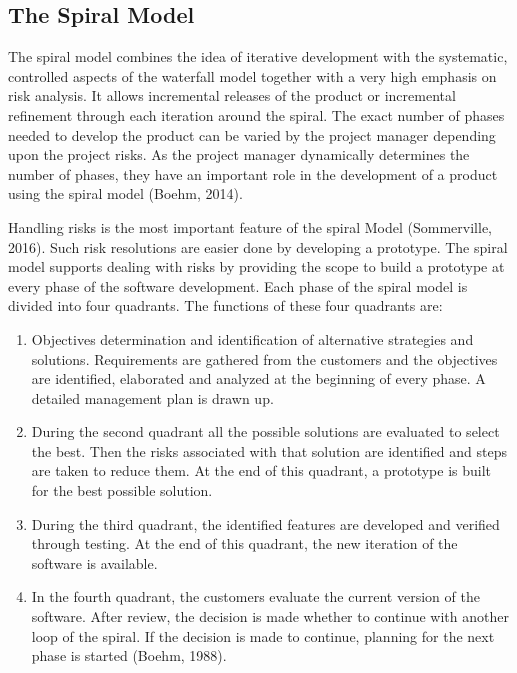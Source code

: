\subsection{The Spiral Model}

The spiral model combines the idea of iterative development with the systematic, controlled aspects of the waterfall model together with a very high emphasis on risk analysis. It allows incremental releases of the product or incremental refinement through each iteration around the spiral. The exact number of phases needed to develop the product can be varied by the project manager depending upon the project risks. As the project manager dynamically determines the number of phases, they have an important role in the development of a product using the spiral model (Boehm, 2014).

Handling risks is the most important feature of the spiral Model (Sommerville, 2016). Such risk resolutions are easier done by developing a prototype. The spiral model supports dealing with risks by providing the scope to build a prototype at every phase of the software development.
Each phase of the spiral model is divided into four quadrants. The functions of these four quadrants are:

\begin{enumerate}
	\item Objectives determination and identification of alternative strategies and solutions. Requirements are gathered from the customers and the objectives are identified, elaborated and analyzed at the beginning of every phase. A detailed management plan is drawn up.

	\item During the second quadrant all the possible solutions are evaluated to select the best. Then the risks associated with that solution are identified and steps are taken to reduce them. At the end of this quadrant, a prototype is built for the best possible solution.

	\item During the third quadrant, the identified features are developed and verified through testing. At the end of this quadrant, the new iteration of the software is available.
	\item In the fourth quadrant, the customers evaluate the current version of the software. After review, the decision is made whether to continue with another loop of the spiral. If the decision is made to continue, planning for the next phase is started (Boehm,  1988).
\end{enumerate}


